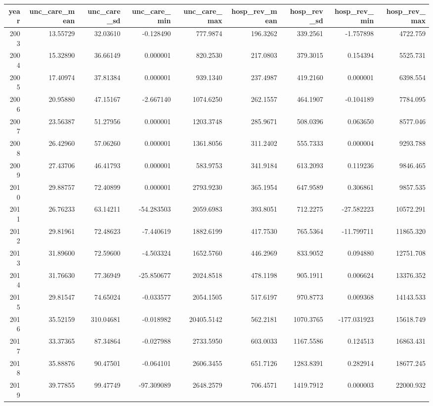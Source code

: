\documentclass[
]{article}
\begin{document}
\begin{tabular}{r|r|r|r|r|r|r|r|r}
\hline
year & unc\_care\_mean & unc\_care\_sd & unc\_care\_min & unc\_care\_max & hosp\_rev\_mean & hosp\_rev\_sd & hosp\_rev\_min & hosp\_rev\_max\\
\hline
2003 & 13.55729 & 32.03610 & -0.128490 & 777.9874 & 196.3262 & 339.2561 & -1.757898 & 4722.759\\
\hline
2004 & 15.32890 & 36.66149 & 0.000001 & 820.2530 & 217.0803 & 379.3015 & 0.154394 & 5525.731\\
\hline
2005 & 17.40974 & 37.81384 & 0.000001 & 939.1340 & 237.4987 & 419.2160 & 0.000001 & 6398.554\\
\hline
2006 & 20.95880 & 47.15167 & -2.667140 & 1074.6250 & 262.1557 & 464.1907 & -0.104189 & 7784.095\\
\hline
2007 & 23.56387 & 51.27956 & 0.000001 & 1203.3748 & 285.9671 & 508.0396 & 0.063650 & 8577.046\\
\hline
2008 & 26.42960 & 57.06260 & 0.000001 & 1361.8056 & 311.2402 & 555.7333 & 0.000004 & 9293.788\\
\hline
2009 & 27.43706 & 46.41793 & 0.000001 & 583.9753 & 341.9184 & 613.2093 & 0.119236 & 9846.465\\
\hline
2010 & 29.88757 & 72.40899 & 0.000001 & 2793.9230 & 365.1954 & 647.9589 & 0.306861 & 9857.535\\
\hline
2011 & 26.76233 & 63.14211 & -54.283503 & 2059.6983 & 393.8051 & 712.2275 & -27.582223 & 10572.291\\
\hline
2012 & 29.81961 & 72.48623 & -7.440619 & 1882.6199 & 417.7530 & 765.5364 & -11.799711 & 11865.320\\
\hline
2013 & 31.89600 & 72.59600 & -4.503324 & 1652.5760 & 446.2969 & 833.9052 & 0.094880 & 12751.708\\
\hline
2014 & 31.76630 & 77.36949 & -25.850677 & 2024.8518 & 478.1198 & 905.1911 & 0.006624 & 13376.352\\
\hline
2015 & 29.81547 & 74.65024 & -0.033577 & 2054.1505 & 517.6197 & 970.8773 & 0.009368 & 14143.533\\
\hline
2016 & 35.52159 & 310.04681 & -0.018982 & 20405.5142 & 562.2181 & 1070.3765 & -177.031923 & 15618.749\\
\hline
2017 & 33.37365 & 87.34864 & -0.027988 & 2733.5950 & 603.0033 & 1167.5586 & 0.124513 & 16863.431\\
\hline
2018 & 35.88876 & 90.47501 & -0.064101 & 2606.3455 & 651.7126 & 1283.8391 & 0.282914 & 18677.245\\
\hline
2019 & 39.77855 & 99.47749 & -97.309089 & 2648.2579 & 706.4571 & 1419.7912 & 0.000003 & 22000.932\\
\hline
\end{tabular}
\end{document}
